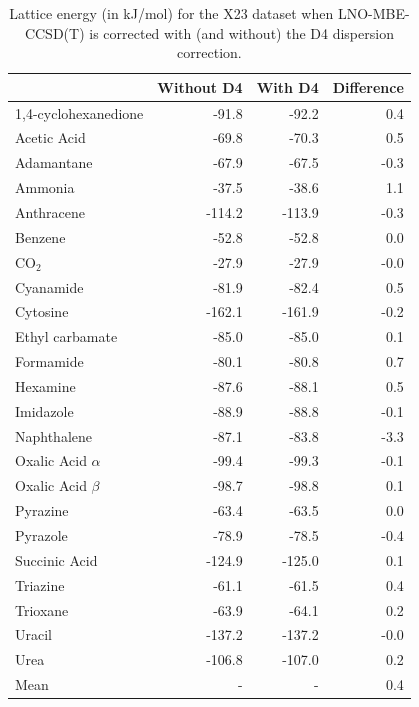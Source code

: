 \begin{table}[h]

\caption{\label{tab:x23_d4_compare}Lattice energy (in kJ/mol) for the X23 dataset when LNO-MBE-CCSD(T) is corrected with (and without) the D4 dispersion correction.}
\begin{tabular}{lrrr}
\toprule
 & Without D4 & With D4 & Difference \\ 
\midrule
1,4-cyclohexanedione & -91.8 & -92.2 & 0.4 \\
Acetic Acid & -69.8 & -70.3 & 0.5 \\
Adamantane & -67.9 & -67.5 & -0.3 \\
Ammonia & -37.5 & -38.6 & 1.1 \\
Anthracene & -114.2 & -113.9 & -0.3 \\
Benzene & -52.8 & -52.8 & 0.0 \\
CO$_2$ & -27.9 & -27.9 & -0.0 \\
Cyanamide & -81.9 & -82.4 & 0.5 \\
Cytosine & -162.1 & -161.9 & -0.2 \\
Ethyl carbamate & -85.0 & -85.0 & 0.1 \\
Formamide & -80.1 & -80.8 & 0.7 \\
Hexamine & -87.6 & -88.1 & 0.5 \\
Imidazole & -88.9 & -88.8 & -0.1 \\
Naphthalene & -87.1 & -83.8 & -3.3 \\
Oxalic Acid $\alpha$ & -99.4 & -99.3 & -0.1 \\
Oxalic Acid $\beta$ & -98.7 & -98.8 & 0.1 \\
Pyrazine & -63.4 & -63.5 & 0.0 \\
Pyrazole & -78.9 & -78.5 & -0.4 \\
Succinic Acid & -124.9 & -125.0 & 0.1 \\
Triazine & -61.1 & -61.5 & 0.4 \\
Trioxane & -63.9 & -64.1 & 0.2 \\
Uracil & -137.2 & -137.2 & -0.0 \\
Urea & -106.8 & -107.0 & 0.2 \\
Mean & - & - & 0.4 \\
\bottomrule
\end{tabular}

\end{table}